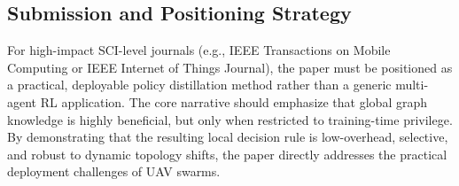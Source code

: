\subsection{Submission and Positioning Strategy}
For high-impact SCI-level journals (e.g., IEEE Transactions on Mobile Computing or IEEE Internet of Things Journal), the paper must be positioned as a practical, deployable policy distillation method rather than a generic multi-agent RL application. The core narrative should emphasize that global graph knowledge is highly beneficial, but only when restricted to training-time privilege. By demonstrating that the resulting local decision rule is low-overhead, selective, and robust to dynamic topology shifts, the paper directly addresses the practical deployment challenges of UAV swarms.

